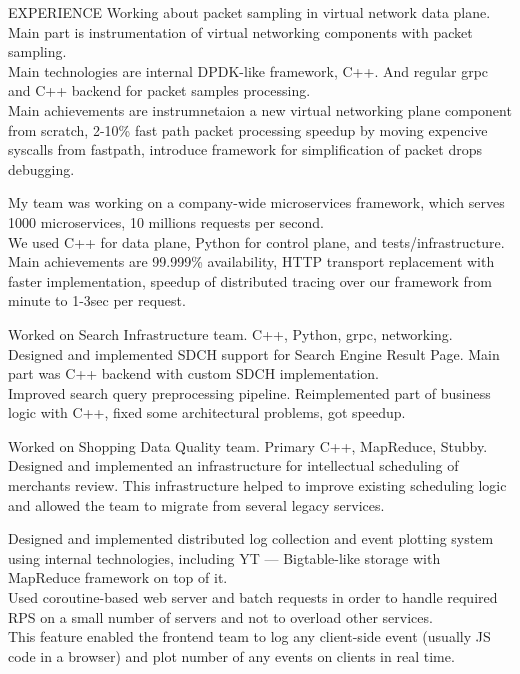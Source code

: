\documentclass[12pt]{cutecv}
\begin{document}
\begin{paracol}{2}
\begin{leftcolumn}
\end{leftcolumn}

\begin{rightcolumn}
\begin{cvsection}{EXPERIENCE}
  {Working about packet sampling in virtual network data plane. Main part is instrumentation of virtual
  networking components with packet sampling. \\
  Main technologies are internal DPDK-like framework, C++. 
  And regular grpc and C++ backend for packet samples processing. \\
  Main achievements are instrumnetaion a new virtual networking plane component from scratch,
  2-10\% fast path packet processing speedup by moving expencive syscalls from fastpath, introduce framework for 
  simplification of packet drops debugging.}
  
  {My team was working on a company-wide microservices framework, which serves
  1000 microservices, 10 millions requests per second.\\
  We used C++ for data plane, Python for control plane, and tests/infrastructure.\\
  Main achievements are 99.999\% availability, HTTP transport replacement
  with faster implementation, speedup of distributed tracing over our
  framework from minute to 1-3sec per request.}

  {Worked on Search Infrastructure team. C++, Python, grpc, networking.
  Designed and implemented SDCH support for Search Engine Result Page.
  Main part was C++ backend with custom SDCH implementation.\\
  Improved search query preprocessing pipeline. Reimplemented part of business logic with C++, fixed some architectural problems, got speedup.}
  
  {Worked on Shopping Data Quality team. Primary C++, MapReduce, Stubby.
   Designed and implemented an infrastructure for intellectual scheduling of merchants review. This infrastructure helped to improve existing scheduling logic
   and allowed the team to migrate from several legacy services.}
  
  {Designed and implemented distributed log collection and event
   plotting system using internal technologies, including YT — Bigtable-like
   storage with MapReduce framework on top of it. \\
   Used coroutine-based web server and batch requests in order
   to handle required RPS on a small number of servers and not to overload
   other services. \\
   This feature enabled the frontend team to log any client-side
   event (usually JS code in a browser) and plot number of any events on
   clients in real time.}


\end{cvsection}
\end{rightcolumn}
\end{paracol}
\end{document}
